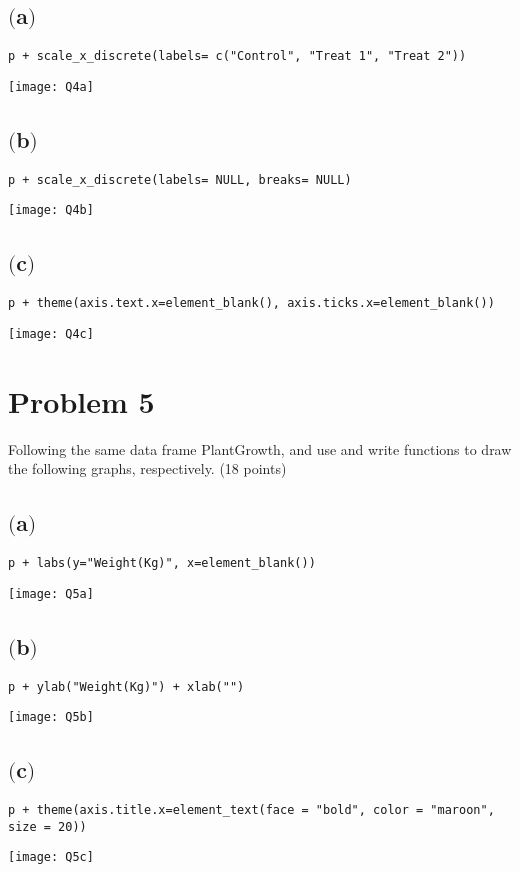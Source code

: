\documentclass[a4paper,man,natbib]{apa6}
\begin{document}
\subsection{$($a$)$}
\begin{verbatim}
p + scale_x_discrete(labels= c("Control", "Treat 1", "Treat 2"))
\end{verbatim}
\texttt{[image: Q4a]}

\subsection{$($b$)$}
\begin{verbatim}
p + scale_x_discrete(labels= NULL, breaks= NULL)
\end{verbatim}
\texttt{[image: Q4b]}

\subsection{$($c$)$}
\begin{verbatim}
p + theme(axis.text.x=element_blank(), axis.ticks.x=element_blank())
\end{verbatim}
\texttt{[image: Q4c]}

\section{Problem 5}
Following the same data frame PlantGrowth, and use and write functions to draw the following graphs, respectively. (18 points)

\subsection{$($a$)$}
\begin{verbatim}
p + labs(y="Weight(Kg)", x=element_blank())
\end{verbatim}
\texttt{[image: Q5a]}

\subsection{$($b$)$}
\begin{verbatim}
p + ylab("Weight(Kg)") + xlab("")
\end{verbatim}
\texttt{[image: Q5b]}

\subsection{$($c$)$}
\begin{verbatim}
p + theme(axis.title.x=element_text(face = "bold", color = "maroon", size = 20))
\end{verbatim}
\texttt{[image: Q5c]}
\end{document}
